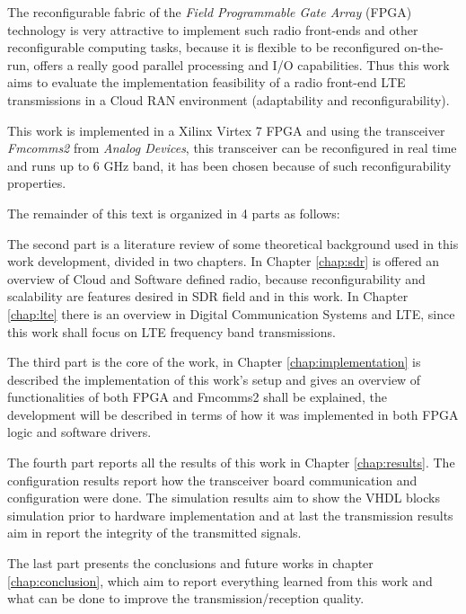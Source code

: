 The reconfigurable fabric of the \textit{Field Programmable Gate Array} (FPGA)
technology is very attractive to implement such radio front-ends and other
reconfigurable computing tasks, because it is flexible to be reconfigured
on-the-run, offers a really good parallel processing and I/O capabilities. Thus
this work aims to evaluate the implementation feasibility of a radio front-end
LTE transmissions in a Cloud RAN environment (adaptability and
reconfigurability).

This work is implemented in a Xilinx Virtex 7 FPGA and using the transceiver
\textit{Fmcomms2} from \textit{Analog Devices}, this transceiver can be
reconfigured in real time and runs up to 6 GHz band, it has been chosen because
of such reconfigurability properties.

The remainder of this text is organized in 4 parts as follows:

The second part is a literature review of some theoretical background used in
this work development, divided in two chapters. In Chapter \ref{chap:sdr} is
offered an overview of Cloud and Software defined radio, because
reconfigurability and scalability are features desired in SDR field and in this
work. In Chapter \ref{chap:lte} there is an overview in Digital Communication
Systems and LTE, since this work shall focus on LTE  frequency band
transmissions.

The third part is the core of the work, in Chapter \ref{chap:implementation} is
described the implementation of this work's setup and gives an overview of
functionalities of both FPGA and Fmcomms2 shall be explained, the
development will be described in terms of how it was implemented in both FPGA
logic and software drivers.

The fourth part reports all the results of this work in Chapter
\ref{chap:results}. The configuration results report how the transceiver board
communication and configuration were done. The simulation results aim to show
the VHDL blocks simulation prior to hardware implementation and at last the
transmission results aim in report the integrity of the transmitted signals.

The last part presents the conclusions and future works in chapter
\ref{chap:conclusion}, which aim to report everything learned from this work and
what can be done to improve the transmission/reception quality.
